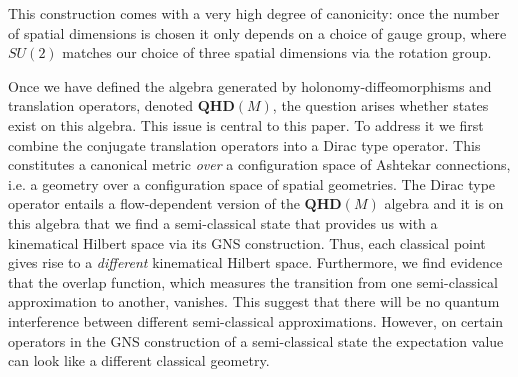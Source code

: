 \documentclass[12pt]{article}
\begin{document}
This construction comes with a very high degree of canonicity: once the number of spatial dimensions is chosen it only depends on a choice of gauge group, where $SU(2)$ matches our choice of three spatial dimensions via the rotation group.


Once we have defined the algebra generated by holonomy-diffeomorphisms and translation operators, denoted $\mathbf{QHD}(M)$, the question arises whether states exist on this algebra. This issue is central to this paper. To address it we first combine the conjugate translation operators into a Dirac type operator. This constitutes a canonical metric {\it over} a configuration space of Ashtekar connections, i.e. a geometry over a configuration space of spatial geometries.
The Dirac type operator entails a flow-dependent version of the $\mathbf{QHD}(M)$ algebra and it is on this algebra that we find a semi-classical state that provides us with a kinematical Hilbert space via its GNS construction. 
Thus, each classical point gives rise to a {\it different} kinematical Hilbert space. Furthermore, we find evidence that the overlap function, which measures the transition from one semi-classical approximation to another, vanishes. This suggest that there will be no quantum interference between different semi-classical approximations. However, on certain operators in the GNS construction of a semi-classical state the expectation value can look like a different classical geometry.




\end{document}
